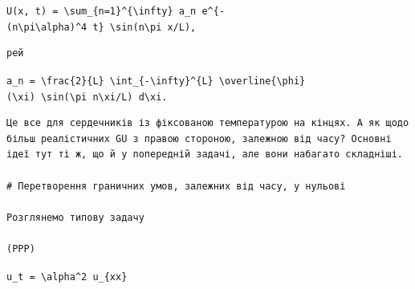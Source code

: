 \documentclass[
  ukrainian,
]{article}
\begin{document}
\texttt{U(x,\ t)\ =\ \textbackslash{}sum\_\{n=1\}\^{}\{\textbackslash{}infty\}\ a\_n\ e\^{}\{-(n\textbackslash{}pi\textbackslash{}alpha)\^{}4\ t\}\ \textbackslash{}sin(n\textbackslash{}pi\ x/L),}

\begin{verbatim}
рей
\end{verbatim}

\texttt{a\_n\ =\ \textbackslash{}frac\{2\}\{L\}\ \textbackslash{}int\_\{-\textbackslash{}infty\}\^{}\{L\}\ \textbackslash{}overline\{\textbackslash{}phi\}(\textbackslash{}xi)\ \textbackslash{}sin(\textbackslash{}pi\ n\textbackslash{}xi/L)\ d\textbackslash{}xi.}

\begin{verbatim}
Це все для сердечників із фіксованою температурою на кінцях. А як щодо більш реалістичних GU з правою стороною, залежною від часу? Основні ідеї тут ті ж, що й у попередній задачі, але вони набагато складніші.

# Перетворення граничних умов, залежних від часу, у нульові

Розглянемо типову задачу

(PPP)
\end{verbatim}

\texttt{u\_t\ =\ \textbackslash{}alpha\^{}2\ u\_\{xx\}}
\end{document}
